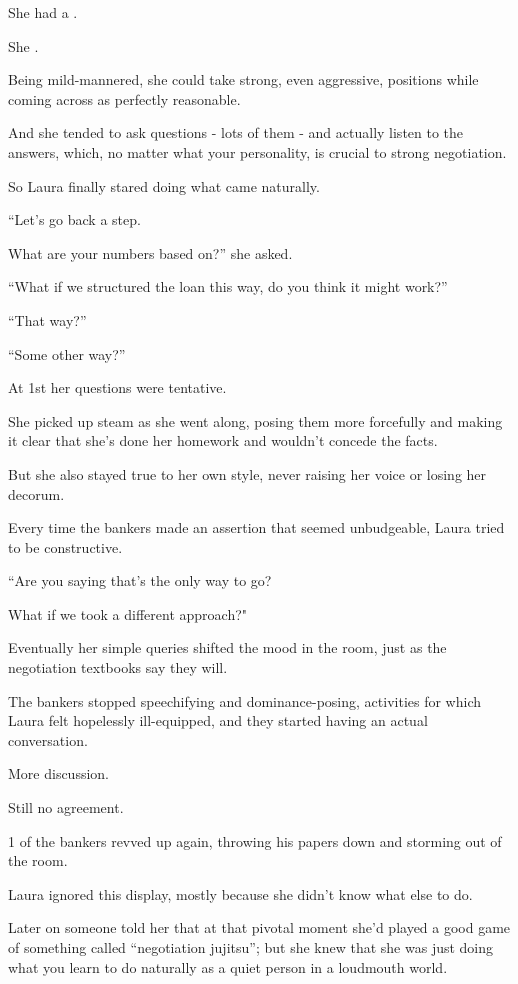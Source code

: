 \documentclass[oneside]{article}
\numberwithin{equation}{section}
\begin{document}
She had a .

She .

Being mild-mannered, she could take strong, even aggressive, positions while coming across as perfectly reasonable.

And she tended to ask questions - lots of them - and actually listen to the answers, which, no matter what your personality, is crucial to strong negotiation.

%
So Laura finally stared doing what came naturally.

%
``Let's go back a step.

What are your numbers based on?'' she asked.

%
``What if we structured the loan this way, do you think it might work?''

%
``That way?''

%
``Some other way?''

%
At 1st her questions were tentative.

She picked up steam as she went along, posing them more forcefully and making it clear that she's done her homework and wouldn't concede the facts.

But she also stayed true to her own style, never raising her voice or losing her decorum.

Every time the bankers made an assertion that seemed unbudgeable, Laura tried to be constructive.

``Are you saying that's the only way to go?

What if we took a different approach?"

%
Eventually her simple queries shifted the mood in the room, just as the negotiation textbooks say they will.

The bankers stopped speechifying and dominance-posing, activities for which Laura felt hopelessly ill-equipped, and they started having an actual conversation.

%
More discussion.

Still no agreement.

1 of the bankers revved up again, throwing his papers down and storming out of the room.

Laura ignored this display, mostly because she didn't know what else to do.

Later on someone told her that at that pivotal moment she'd played a good game of something called ``negotiation jujitsu''; but she knew that she was just doing what you learn to do naturally as a quiet person in a loudmouth world.
\end{document}
